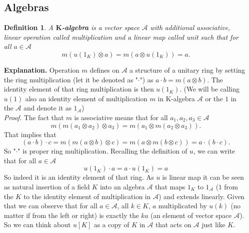 \documentclass[a4paper, 12pt]{article}
\newtheorem{definition}{Definition}
\begin{document}
\subsection{Algebras}
\begin{definition}
A \textbf{$\textbf{K}$-algebra} is a vector space $\mathcal{A}$ with additional
associative, linear operation
 called multiplication and a linear map
 called unit such that for all $a \in \mathcal{A}$
\begin{equation*}
m(u(1_K) \otimes a) = m(a \otimes u(1_K)) = a.
\end{equation*}
\end{definition}
\textbf{Explanation. } Operation $m$ defines on $\mathcal{A}$ a structure of a unitary ring by setting the
ring multiplication (let it be denoted as "$\cdot$") as $a \cdot b = m(a \otimes b)$. The identity element
of that ring multiplication is then $u(1_K)$. (We will be calling $u(1)$ also an identity element of
multiplication $m$ in K-algebra $\mathcal{A}$ or the $1$ in the $\mathcal{A}$ and
denote it as $1_\mathcal{A}$)\\
\textit{Proof.} The fact that $m$ is associative means that for all $a_1, a_2, a_3 \in \mathcal{A}$
\begin{equation*}
m(m(a_1 \otimes a_2) \otimes a_3) = m(a_1 \otimes m(a_2 \otimes a_3)).
\end{equation*}
That implies that
\begin{equation*}
(a\cdot b) \cdot c = m(m(a \otimes b) \otimes c) = m(a \otimes m(b \otimes c)) = a \cdot (b \cdot c).
\end{equation*}
So "$\cdot$" is proper ring multiplication. Recalling the definition of $u$, we can write that for all
$a \in \mathcal{A}$
\begin{equation*}
u(1_K) \cdot a = a \cdot u(1_K) = a
\end{equation*}
So indeed it is an identity
element of that ring. As $u$ is linear map it can be seen as natural insertion of a field $K$ into an
algebra $\mathcal{A}$ that maps $1_K$ to $1_\mathcal{A}$ ($1$ from the $K$ to the identity element of
multiplication in $\mathcal{A}$) and extends linearly. Given that we can observe
that for all $a \in \mathcal{A}$, all $k \in K$, $a$ multiplicated by $u(k)$ (no matter if from the left
or right) is exactly the $ka$ (an element of vector space $\mathcal{A}$).
So we can think about $u[K]$ as a copy of $K$ in $\mathcal{A}$ that acts on $\mathcal{A}$ just like $K$.\\
\end{document}
